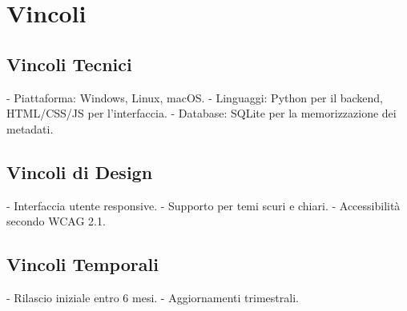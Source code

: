 \section{Vincoli}

\subsection{Vincoli Tecnici}

- Piattaforma: Windows, Linux, macOS.
- Linguaggi: Python per il backend, HTML/CSS/JS per l'interfaccia.
- Database: SQLite per la memorizzazione dei metadati.

\subsection{Vincoli di Design}

- Interfaccia utente responsive.
- Supporto per temi scuri e chiari.
- Accessibilità secondo WCAG 2.1.

\subsection{Vincoli Temporali}

- Rilascio iniziale entro 6 mesi.
- Aggiornamenti trimestrali.